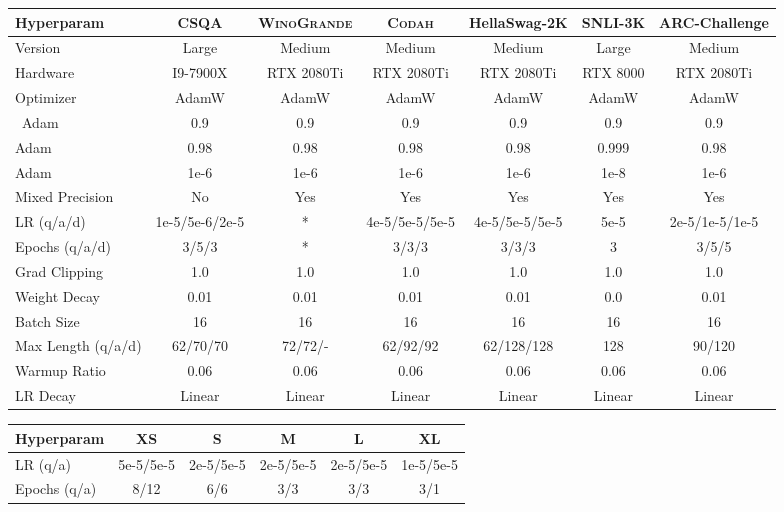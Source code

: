 \documentclass[11pt,a4paper]{article}
\newcommand{\winogrande}{\textsc{WinoGrande}\xspace}
\newcommand{\codah}{\textsc{Codah}\xspace}
\begin{document}
\begin{table*}[t]
\begin{center}
\footnotesize
\begin{tabular}{lcccccc}
\toprule
\bf Hyperparam  & \bf CSQA &\bf \winogrande & \bf \codah &\bf HellaSwag-2K &\bf SNLI-3K &\bf ARC-Challenge \\
\midrule 
Version  & Large  &Medium  &Medium  &Medium  &Large &Medium\\
Hardware &I9-7900X &RTX 2080Ti &RTX 2080Ti  &RTX 2080Ti &RTX 8000 &RTX 2080Ti \\
Optimizer &AdamW  &AdamW  &AdamW &AdamW &AdamW &AdamW\\\
Adam  & 0.9  &0.9 &0.9  &0.9 &0.9 &0.9\\
Adam   & 0.98 &0.98 &0.98  &0.98 &0.999 &0.98\\
Adam  &1e-6 &1e-6   &1e-6   &1e-6 &1e-8 &1e-6 \\
Mixed Precision  &No  &Yes  &Yes    &Yes  &Yes &Yes\\
LR (q/a/d) &1e-5/5e-6/2e-5 &* &4e-5/5e-5/5e-5 &4e-5/5e-5/5e-5  &5e-5 &2e-5/1e-5/1e-5\\
Epochs (q/a/d) & 3/5/3 &*  & 3/3/3 &3/3/3 &3 &3/5/5\\
Grad Clipping &1.0 &1.0   &1.0 &1.0 &1.0 &1.0\\
Weight Decay & 0.01 & 0.01 & 0.01 &0.01 &0.0 &0.01 \\
Batch Size & 16 & 16  & 16 &16 &16 &16 \\
Max Length (q/a/d) &62/70/70 &72/72/-   &62/92/92  &62/128/128 &128 &90/120\\
Warmup Ratio & 0.06 & 0.06 & 0.06  &0.06 &0.06 &0.06\\
LR Decay & Linear &Linear &Linear &Linear &Linear &Linear  \\
\bottomrule
\end{tabular}
\end{center}
\caption{
Hyperparameter settings for finetuning GPT-2. "q/a/d" stands for "question/answer/distractor". Some hyperparameters for \winogrande is shown in a separate table as they vary with the train size.   
}
\label{app:gpt2_finetune_hyperparams}
\end{table*}


\begin{table*}[t]
\begin{center}
\footnotesize
\begin{tabular}{lccccc}
\toprule
\bf Hyperparam  & \bf XS  & \bf S &\bf M &\bf L &\bf XL \\
\midrule 

LR (q/a) &5e-5/5e-5 &2e-5/5e-5  &2e-5/5e-5 &2e-5/5e-5 &1e-5/5e-5  \\
Epochs (q/a) &8/12  & 6/6 &3/3 &3/3 &3/1\\

\bottomrule
\end{tabular}
\end{center}
\caption{
Hyperparameter settings for finetuning GPT-2 on \winogrande.
}
\label{app:gpt2_finetune_hyperparams_wino}
\end{table*}
\end{document}

